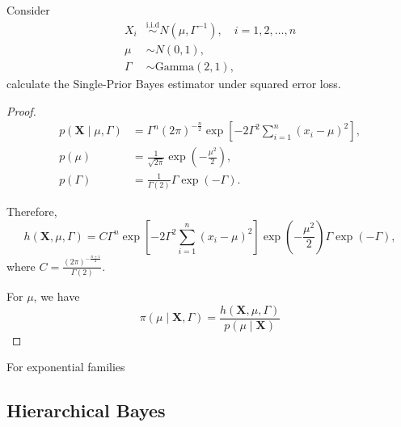 \begin{example}
	Consider
	\begin{equation*}
		\begin{aligned}
			X_i    & \stackrel{\text{i.i.d}}{\sim}N(\mu,\Gamma^{-1}),\quad i=1,2,\ldots,n \\
			\mu    & \sim N(0,1),                                                         \\
			\Gamma & \sim\text{Gamma}(2,1),
		\end{aligned}
	\end{equation*}
	calculate the Single-Prior Bayes estimator under squared error loss.
\end{example}

\begin{proof}
	\begin{equation*}
		\begin{aligned}
			p\left(\textbf{X}\mid\mu,\Gamma\right) & =\Gamma^n(2\pi)^{-\frac{n}{2}}\exp\left[-2\Gamma^2\sum_{i=1}^{n}(x_i-\mu)^2\right], \\
			p(\mu)                                 & =\frac{1}{\sqrt{2\pi}}\exp\left(-\frac{\mu^2}{2}\right),                            \\
			p(\Gamma)                              & =\frac{1}{\Gamma(2)}\Gamma\exp\left(-\Gamma\right).
		\end{aligned}
	\end{equation*}

	Therefore,
	\begin{equation*}
		h\left(\textbf{X},\mu,\Gamma\right)=C\Gamma^n\exp\left[-2\Gamma^2\sum_{i=1}^{n}(x_i-\mu)^2\right]\exp\left(-\frac{\mu^2}{2}\right)\Gamma\exp\left(-\Gamma\right),
	\end{equation*}
	where \(C=\frac{(2\pi)^{-\frac{n+1}{2}}}{\Gamma(2)}\).

	For \(\mu\), we have
	\begin{equation*}
		\pi\left(\mu\mid\textbf{X},\Gamma\right)=\frac{h\left(\textbf{X},\mu,\Gamma\right)}{p(\mu\mid\textbf{X})}
	\end{equation*}
\end{proof}

For exponential families

\begin{theorem}

\end{theorem}

\subsection{Hierarchical Bayes}

